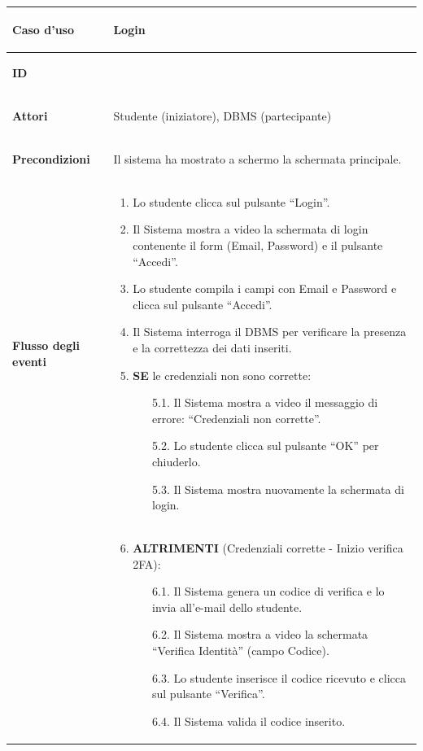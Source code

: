 \documentclass[12pt,a4paper]{article}
\begin{document}
\small
\begin{longtable}{|
>{\columncolor{unipablue}\color{white}\bfseries\raggedright\arraybackslash}p{3.4cm}|
>{\raggedright\arraybackslash}p{11.1cm}|}
\hline
\textbf{Caso d’uso} & Login \\ \hline
\textbf{ID} & 1.1 \\ \hline
\textbf{Attori} & Studente (iniziatore), DBMS (partecipante) \\ \hline
\textbf{Precondizioni} & Il sistema ha mostrato a schermo la schermata principale. \\ \hline
\textbf{Flusso degli eventi} &
\begin{enumerate}
    \item Lo studente clicca sul pulsante ``Login''.
    \item Il Sistema mostra a video la schermata di login contenente il form (Email, Password) e il pulsante ``Accedi''.
    \item Lo studente compila i campi con Email e Password e clicca sul pulsante ``Accedi''.
    \item Il Sistema interroga il DBMS per verificare la presenza e la correttezza dei dati inseriti.
    \item \textbf{SE} le credenziali non sono corrette:
    \begin{itemize}
        \item[5.1.] Il Sistema mostra a video il messaggio di errore: ``Credenziali non corrette''.
        \item[5.2.] Lo studente clicca sul pulsante ``OK'' per chiuderlo.
        \item[5.3.] Il Sistema mostra nuovamente la schermata di login.
    \end{itemize}
\end{enumerate} \\
&
\begin{enumerate}
    \setcounter{enumi}{5}
    \item \textbf{ALTRIMENTI} (Credenziali corrette - Inizio verifica 2FA):
    \begin{itemize}
        \item[6.1.] Il Sistema genera un codice di verifica e lo invia all’e-mail dello studente.
        \item[6.2.] Il Sistema mostra a video la schermata ``Verifica Identità'' (campo Codice).
        \item[6.3.] Lo studente inserisce il codice ricevuto e clicca sul pulsante ``Verifica''.
        \item[6.4.] Il Sistema valida il codice inserito.

\end{itemize}
\end{enumerate}
\end{longtable}
\end{document}
